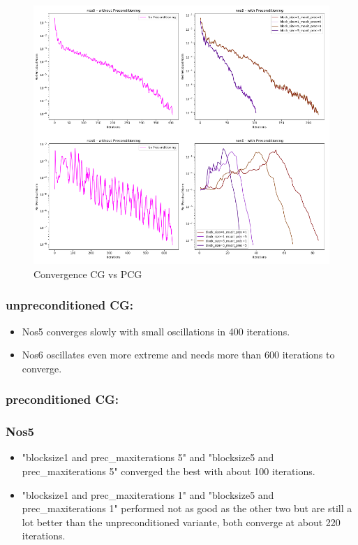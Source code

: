 \documentclass{article}
\begin{document}
\begin{figure}[h!]
    \centering
    \includegraphics[width=1\linewidth]{pcg_vs_cg.PNG}
    \caption{Convergence CG vs PCG}
\end{figure}

\subsubsection*{unpreconditioned CG:}
\begin{itemize}
    \item Nos5 converges slowly with small oscillations in 400 iterations.
    \item Nos6 oscillates even more extreme and needs more than 600 iterations to converge.

\end{itemize}

\subsubsection*{preconditioned CG:}

\subsubsection*{Nos5} 

\begin{itemize}
    \item "blocksize1 and prec\_maxiterations 5" and "blocksize5 and prec\_maxiterations 5" converged the best with about 100 iterations.
    \item "blocksize1 and prec\_maxiterations 1" and "blocksize5 and prec\_maxiterations 1" performed not as good as the other two but are still a lot better than the unpreconditioned variante, both converge at about 220 iterations.

\end{itemize}
\end{document}
